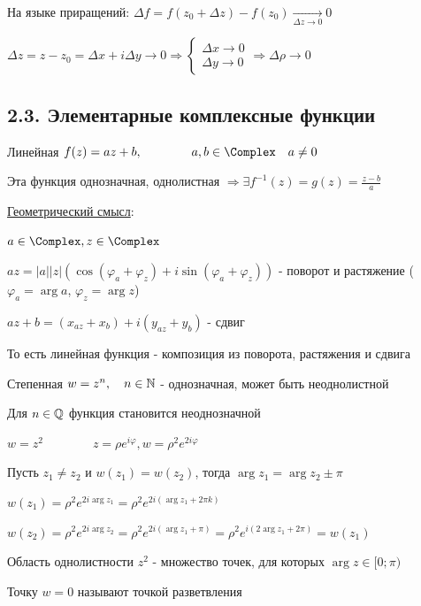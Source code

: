 \documentclass[12pt]{article}
\begin{document}
На языке приращений: $\Delta f = f(z_0 + \Delta z) - f(z_0) \underset{\Delta z \to 0}{\longrightarrow} 0$

$\Delta z = z - z_0 = \Delta x + i \Delta y \to 0 \Longrightarrow 
\begin{cases}\Delta x \to 0 \\ \Delta y \to 0\end{cases} \Longrightarrow 
\Delta \rho \to 0$

\subsection{2.3. Элементарные комплексные функции}

 Линейная $f(z) = az + b, \qquad\qquad a, b \in \Complex \quad a \neq 0$

Эта функция однозначная, однолистная $\Longrightarrow \exists f^{-1}(z) = g(z) = \frac{z - b}{a}$

\underline{Геометрический смысл}:

$a \in \Complex, z \in \Complex$

$az = |a| |z| (\cos (\varphi_a + \varphi_z) + i \sin (\varphi_a + \varphi_z))$ - поворот и растяжение 
($\varphi_a = \arg a$, $\varphi_z = \arg z$)

$az + b = (x_{az} + x_b) + i (y_{az} + y_b)$ - сдвиг

То есть линейная функция - композиция из поворота, растяжения и сдвига

 Степенная $w = z^n, \quad n \in \mathbb{N}$ - однозначная, может быть неоднолистной

Для $n \in \mathbb{Q}$ функция становится неоднозначной

\Exs $w = z^2 \qquad\qquad z = \rho e^{i\varphi}, w = \rho^2 e^{2i\varphi}$

Пусть $z_1 \neq z_2$ и $w(z_1) = w(z_2)$, тогда $\arg z_1 = \arg z_2 \pm \pi$ 

$w(z_1) = \rho^2 e^{2i\arg z_1} = \rho^2 e^{2i (\arg z_1 + 2\pi k)}$

$w(z_2) = \rho^2 e^{2i\arg z_2} = \rho^2 e^{2i (\arg z_1 + \pi)} = \rho^2 e^{i (2\arg z_1 + 2\pi)} = w(z_1)$

Область однолистности $z^2$ - множество точек, для которых $\arg z \in [0; \pi)$

Точку $w = 0$ называют точкой разветвления

\end{document}
